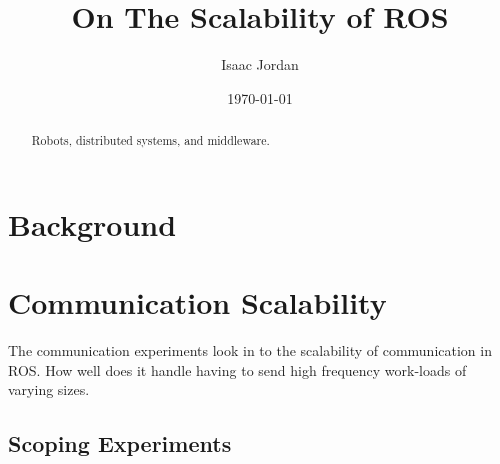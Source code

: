 \documentclass{l4proj}
\begin{document}
\title{On The Scalability of ROS}
\author{Isaac Jordan}
\date{\today}
\maketitle

\begin{abstract}
Robots, distributed systems, and middleware.
\end{abstract}

\educationalconsent
%
%
\tableofcontents

\pagebreak
{}




\chapter{Background}
\label{background-chapter}









\chapter{Communication Scalability}
\label{communication-chapter}

The communication experiments look in to the scalability of communication in ROS. How well does it handle having to send high frequency work-loads of varying sizes.

\section{Scoping Experiments}
\end{document}
